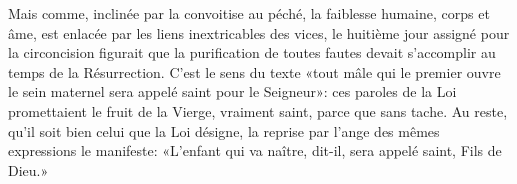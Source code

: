 Mais comme, inclinée par la convoitise au péché,
	la faiblesse humaine, corps et âme,
		est enlacée par les liens inextricables des vices,
	le huitième jour assigné pour la circoncision
		figurait que la purification de toutes fautes
		devait s'accomplir au temps de la Résurrection.
C'est le sens du texte «tout mâle qui le premier ouvre le sein maternel
		sera appelé saint pour le Seigneur»:
	ces paroles de la Loi promettaient le fruit de la Vierge,
	vraiment saint, parce que sans tache.
Au reste, qu'il soit bien celui que la Loi désigne,
	la reprise par l'ange des mêmes expressions le manifeste:
	«L'enfant qui va naître, dit-il, sera appelé saint, Fils de Dieu.»
